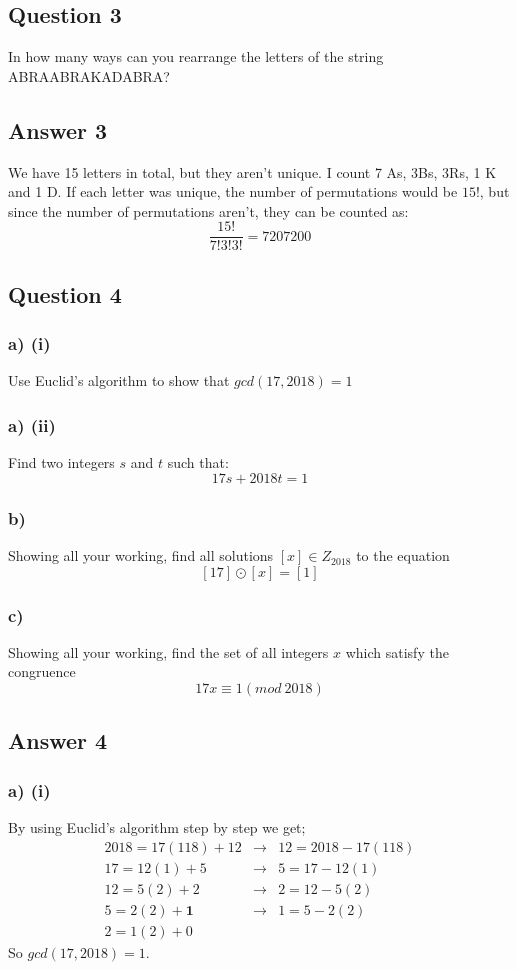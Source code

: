\documentclass{article}
\begin{document}
	\subsection*{Question 3}
	In how many ways can you rearrange the letters of the string
	ABRAABRAKADABRA?
	
	\subsection*{Answer 3}
	We have 15 letters in total, but they aren't unique. I count 7 As, 3Bs, 3Rs, 1 K and 1 D.
	If each letter was unique, the number of permutations would be $15!$, but since the number of permutations aren't, they can be counted as:
	$$
	\frac{15!}{7!3!3!} = 7207200
	$$
	
	\subsection*{Question 4}
	\subsubsection*{a) (i)}
	Use Euclid's algorithm to show that $gcd(17,2018)=1$
	\subsubsection*{a) (ii)}
	Find two integers $s$ and $t$ such that:
	$$
	17s+2018t=1
	$$
	
	\subsubsection*{b)}
	Showing all your working, find all solutions $[x] \in Z_{2018}$ to the equation
	$$
	[17] \odot [x] = [1]
	$$
	
	\subsubsection*{c)}
	Showing all your working, find the set of all integers $x$ which satisfy the congruence
	$$
	17x \equiv 1 (mod \ 2018)
	$$
	
	\subsection*{Answer 4}
	\subsubsection*{a) (i)}
	By using Euclid's algorithm step by step we get;
	\begin{align*}
	2018 = 17(118) + 12 & \rightarrow & 12 = 2018-17(118) \\
	17=12(1)+5 & \rightarrow & 5=17-12(1) \\
	12=5(2)+2 & \rightarrow & 2=12-5(2) \\
	5=2(2)+\textbf{1} & \rightarrow & 1=5-2(2) \\
	2=1(2) + 0
	\end{align*}
	So $gcd(17,2018)=1$.
\end{document}
